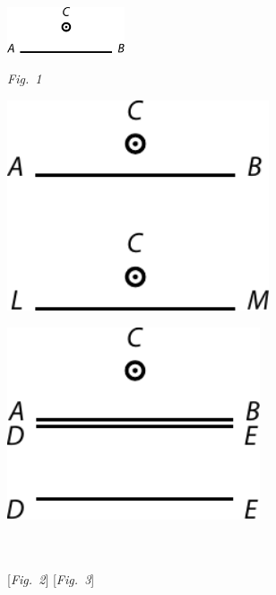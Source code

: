 \pend
 \vspace{1.5em}%
%
  \centerline{\includegraphics[width=0.26\textwidth]{gesamttex/edit_VIII,3/images/LH_35_09_15_020v_d1.pdf}}%
  \vspace{0.75em}
  \centerline{\lbrack\textit{Fig.~1}\rbrack}%
\newpage
\pstart\noindent
\hspace{12mm}\begin{minipage}[t]{0.5\textwidth}
\includegraphics[width=0.58\textwidth]{gesamttex/edit_VIII,3/images/LH_35_09_15_020v_d2.pdf}
\end{minipage}
\hspace{3mm}
\begin{minipage}[t]{0.5\textwidth}
\includegraphics[width=0.56\textwidth]{gesamttex/edit_VIII,3/images/LH_35_09_15_020v_d3.pdf}
\end{minipage}\vspace{0.5em}
\\
\\
\hspace*{23mm} [\textit{Fig.~2}]\hspace*{60mm} [\textit{Fig.~3}]
\pend
\vspace{2.5em}
